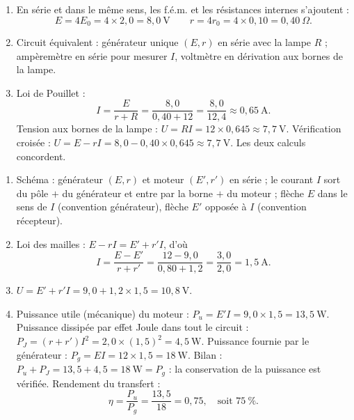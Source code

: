 \documentclass[11pt]{article}
\begin{document}
\begin{corrige}
\begin{enumerate}
\item En série et dans le même sens, les f.é.m. et les résistances internes s'ajoutent :
\[ E = 4E_0 = 4 \times 2,0 = 8,0~\text{V} \qquad r = 4r_0 = 4 \times 0,10 = 0,40~\Omega. \]
\item Circuit équivalent : générateur unique $(E, r)$ en série avec la lampe $R$ ; ampèremètre en série pour mesurer $I$, voltmètre en dérivation aux bornes de la lampe.
\item Loi de Pouillet :
\[ I = \dfrac{E}{r + R} = \dfrac{8,0}{0,40 + 12} = \dfrac{8,0}{12,4} \approx 0,65~\text{A}. \]
Tension aux bornes de la lampe : $U = RI = 12 \times 0,645 \approx 7,7~\text{V}$. Vérification croisée : $U = E - rI = 8,0 - 0,40 \times 0,645 \approx 7,7~\text{V}$. Les deux calculs concordent.
\end{enumerate}
\end{corrige}

\begin{corrige}
\begin{enumerate}
\item Schéma : générateur $(E, r)$ et moteur $(E', r')$ en série ; le courant $I$ sort du pôle $+$ du générateur et entre par la borne $+$ du moteur ; flèche $E$ dans le sens de $I$ (convention générateur), flèche $E'$ opposée à $I$ (convention récepteur).
\item Loi des mailles : $E - rI = E' + r'I$, d'où
\[ I = \dfrac{E - E'}{r + r'} = \dfrac{12 - 9,0}{0,80 + 1,2} = \dfrac{3,0}{2,0} = 1,5~\text{A}. \]
\item $U = E' + r'I = 9,0 + 1,2 \times 1,5 = 10,8~\text{V}$.
\item Puissance utile (mécanique) du moteur : $P_u = E'I = 9,0 \times 1,5 = 13,5~\text{W}$. Puissance dissipée par effet Joule dans tout le circuit : $P_J = (r + r')I^2 = 2,0 \times (1,5)^2 = 4,5~\text{W}$. Puissance fournie par le générateur : $P_g = EI = 12 \times 1,5 = 18~\text{W}$. Bilan : $P_u + P_J = 13,5 + 4,5 = 18~\text{W} = P_g$ : la conservation de la puissance est vérifiée. Rendement du transfert :
\[ \eta = \dfrac{P_u}{P_g} = \dfrac{13,5}{18} = 0,75, \quad \text{soit } 75~\%. \]
\end{enumerate}
\end{corrige}
\end{document}
